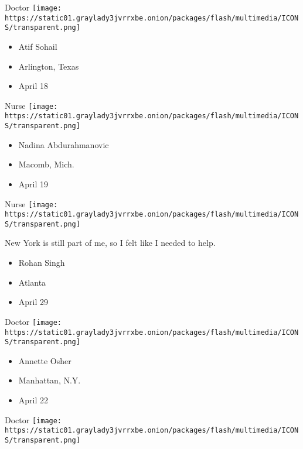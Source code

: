 \protect\hyperlink{item-atif-sohail}{}

Doctor
\texttt{[image: https://static01.graylady3jvrrxbe.onion/packages/flash/multimedia/ICONS/transparent.png]}

\begin{itemize}
\tightlist
\item
  Atif Sohail
\item
  Arlington, Texas
\item
  April 18
\end{itemize}

\protect\hyperlink{item-nadina-abdurahmanovic}{}

Nurse
\texttt{[image: https://static01.graylady3jvrrxbe.onion/packages/flash/multimedia/ICONS/transparent.png]}

\begin{itemize}
\tightlist
\item
  Nadina Abdurahmanovic
\item
  Macomb, Mich.
\item
  April 19
\end{itemize}

\protect\hyperlink{item-rohan-singh}{}

Nurse
\texttt{[image: https://static01.graylady3jvrrxbe.onion/packages/flash/multimedia/ICONS/transparent.png]}

New York is still part of me, so I felt like I needed to help.

\begin{itemize}
\tightlist
\item
  Rohan Singh
\item
  Atlanta
\item
  April 29
\end{itemize}

\protect\hyperlink{item-annette-osher}{}

Doctor
\texttt{[image: https://static01.graylady3jvrrxbe.onion/packages/flash/multimedia/ICONS/transparent.png]}

\begin{itemize}
\tightlist
\item
  Annette Osher
\item
  Manhattan, N.Y.
\item
  April 22
\end{itemize}

\protect\hyperlink{item-hideo-yamanouchi}{}

Doctor
\texttt{[image: https://static01.graylady3jvrrxbe.onion/packages/flash/multimedia/ICONS/transparent.png]}


